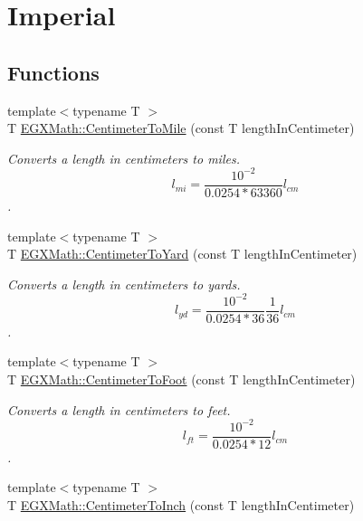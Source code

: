 \hypertarget{group___e_g_x_math-_conversions-_length_conversions-_s_i-_centimeter-_imperial}{}\section{Imperial}
\label{group___e_g_x_math-_conversions-_length_conversions-_s_i-_centimeter-_imperial}
\subsection*{Functions}
\begin{DoxyCompactItemize}
\item 
{\footnotesize template$<$typename T $>$ }\\T \mbox{\hyperlink{group___e_g_x_math-_conversions-_length_conversions-_s_i-_centimeter-_imperial_gacba2e8c1f187fae381009e4413d5d4fb}{E\+G\+X\+Math\+::\+Centimeter\+To\+Mile}} (const T length\+In\+Centimeter)
\begin{DoxyCompactList}\small\item\em Converts a length in centimeters to miles. \[ l_{mi}=\frac{10^{-2}}{0.0254 * 63360} l_{cm} \]. \end{DoxyCompactList}\item 
{\footnotesize template$<$typename T $>$ }\\T \mbox{\hyperlink{group___e_g_x_math-_conversions-_length_conversions-_s_i-_centimeter-_imperial_ga9b25beac97b6dfc0700508ca60760dfe}{E\+G\+X\+Math\+::\+Centimeter\+To\+Yard}} (const T length\+In\+Centimeter)
\begin{DoxyCompactList}\small\item\em Converts a length in centimeters to yards. \[ l_{yd}= \frac{10^{-2}}{0.0254 * 36} \frac{1}{36} l_{cm} \]. \end{DoxyCompactList}\item 
{\footnotesize template$<$typename T $>$ }\\T \mbox{\hyperlink{group___e_g_x_math-_conversions-_length_conversions-_s_i-_centimeter-_imperial_ga27bbb3b1cf61bac428f40d6804e9aaec}{E\+G\+X\+Math\+::\+Centimeter\+To\+Foot}} (const T length\+In\+Centimeter)
\begin{DoxyCompactList}\small\item\em Converts a length in centimeters to feet. \[ l_{ft}= \frac{10^{-2}}{0.0254 * 12} l_{cm} \]. \end{DoxyCompactList}\item 
{\footnotesize template$<$typename T $>$ }\\T \mbox{\hyperlink{group___e_g_x_math-_conversions-_length_conversions-_s_i-_centimeter-_imperial_ga9d90fd3e24ac92c43f57db3e27a24507}{E\+G\+X\+Math\+::\+Centimeter\+To\+Inch}} (const T length\+In\+Centimeter)

\end{DoxyCompactItemize}
